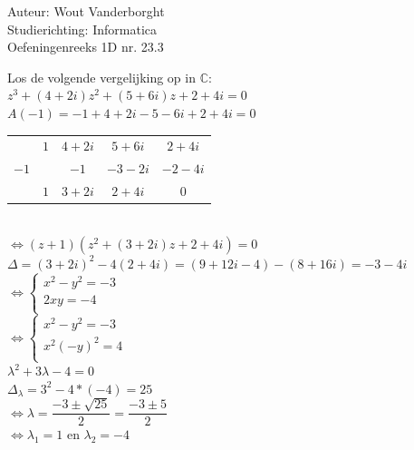 \documentclass[a4paper]{article}
\newcommand{\C}{\mathbb{C}}
\begin{document}
  
\noindent \large Auteur: Wout Vanderborght\\
\noindent \large Studierichting: Informatica\\
\noindent \large Oefeningenreeks 1D nr. 23.3\\

\medskip

\normalsize

Los de volgende vergelijking op in $\C$: \\

$ z^3 + (4+2i)z^2 + (5+6i)z + 2 + 4i = 0 $ \\

$ A(-1) = -1 + 4 + 2i - 5 - 6i + 2 + 4i = 0 $ \\

\begin{tabular}{c|ccc|c}
    & $1$ & $4+2i$ & $5+6i$ & $2+4i$ \\
    $-1$ & & $-1$ & $-3-2i$ & $-2-4i$ \\ \hline
    & $1$ & $3+2i$ & $2+4i$ & $0$
\end{tabular} \\ 

$ \Leftrightarrow (z + 1)(z^2 + (3+2i)z + 2 + 4i) = 0 $ \\

$ \Delta = (3+2i)^2 - 4(2+4i) = (9 + 12i - 4) -(8+16i) = -3-4i $ \\

$\Leftrightarrow \left\{
\begin{array}{l}
    x^2 - y^2 = -3 \\
    2xy = -4 \\
\end{array} \right. $ \\

$\Leftrightarrow \left\{
\begin{array}{l}
    x^2 - y^2 = -3 \\
    x^2(-y)^2 = 4 \\
\end{array} \right. $ \\

$ \lambda^2 + 3\lambda - 4 = 0 $ \\

$ \Delta_\lambda = 3^2 - 4*(-4) = 25 $ \\

$ \Leftrightarrow \lambda = \dfrac{-3 \pm \sqrt{25}}{2} = \dfrac{-3 \pm 5}{2} $ \\

$ \Leftrightarrow \lambda_1 = 1 $ en $ \lambda_2 = -4 $ \\
\end{document}
